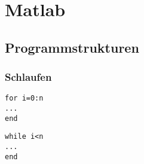 
\section{Matlab}

\subsection{Programmstrukturen}


\subsubsection{Schlaufen}
\begin{lstlisting}[caption=for-Schlaufe, label=for-loop]
for i=0:n
...
end
\end{lstlisting}

\begin{lstlisting}[caption=for-Schlaufe, label=for-loop]
while i<n
...
end
\end{lstlisting}

